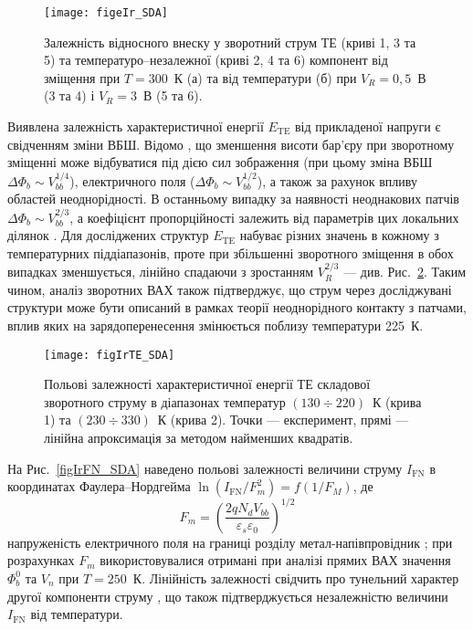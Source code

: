 \begin{figure}
\center
\texttt{[image: figeIr\_SDA]}
\caption{\label{figeIr_SDA}
Залежність відносного внеску у зворотний струм
ТЕ (криві 1, 3 та 5) та температуро--незалежної (криві 2, 4 та 6)
компонент від зміщення при $T=300$~К (а) та
від температури (б) при $V_R=0,5$~В (3 та 4) і $V_R=3$~В (5 та 6).
}%
\end{figure}

Виявлена залежність характеристичної енергії $E_\mathrm{TE}$ від прикладеної напруги є свідченням зміни ВБШ.
Відомо \cite{Rhoderick1988,Tung:PhysRev,Andrews}, що зменшення висоти бар'єру при зворотному зміщенні може відбуватися під дією сил зображення
(при цьому  зміна ВБШ $\Delta\Phi_b\sim V_{bb}^{1/4}$),
електричного поля ($\Delta\Phi_b\sim V_{bb}^{1/2}$),
а також за рахунок впливу областей неоднорідності.
В останньому випадку за наявності неоднакових патчів $\Delta\Phi_b\sim V_{bb}^{2/3}$, а коефіцієнт пропорційності залежить від параметрів цих локальних ділянок \cite{Tung:PhysRev}.
Для досліджених структур $E_\mathrm{TE}$ набуває різних значень в кожному з температурних піддіапазонів,
проте при збільшенні зворотного зміщення в обох випадках зменшується, лінійно спадаючи з зростанням $V^{2/3}_R$ --- див. Рис.~\ref{figIrTE_SDA}.
Таким чином, аналіз зворотних ВАХ також підтверджує,
що струм через досліджувані структури може бути описаний в рамках теорії неоднорідного контакту з патчами,
вплив яких на зарядоперенесення змінюється поблизу температури 225~К.



\begin{figure}
\center
\texttt{[image: figIrTE\_SDA]}
\caption{\label{figIrTE_SDA}
Польові залежності характеристичної енергії ТЕ складової зворотного струму
в діапазонах температур  $(130\div220)$~К (крива 1) та   $(230\div330)$~К (крива 2).
Точки --- експеримент, прямі --- лінійна апроксимація за методом найменших квадратів.
}%
\end{figure}

На Рис.~\ref{figIrFN_SDA} наведено польові залежності величини струму $I_\mathrm{FN}$ в координатах Фаулера--Нордгейма
$\ln(I_\mathrm{FN}/F_m^2)=f(1/F_M)$,
де
\begin{equation}\label{eqFm}
  F_m=\left(\frac{2qN_{d}V_{bb}}{\varepsilon_s\varepsilon_0}\right)^{1/2}
\end{equation}
напруженість електричного поля на границі розділу метал-напівпровідник \cite{Rhoderick1988};
при розрахунках $F_m$ використовувалися отримані при аналізі прямих ВАХ значення $\Phi^0_b$ та  $V_n$ при $T=250$~К.
Лінійність залежності свідчить про тунельний характер другої компоненти струму \cite{Evtuh},
що також підтверджується незалежністю величини $I_\mathrm{FN}$ від температури.



